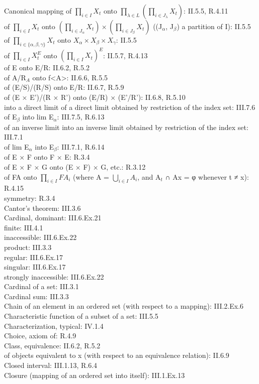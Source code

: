 Canonical mapping of \(\prod_{i\in I}X_t\) onto \(\prod_{\lambda \in L}\left(\prod_{i\in J_\lambda}X_t\right)\): II.5.5, R.4.11\\
of \(\prod_{i\in I}X_t\) onto \(\left(\prod_{i\in J_\alpha}X_t\right) \times \left(\prod_{i\in J_\beta}X_t\right)\) ((J\(_\alpha\), J\(_\beta\)) a partition of I): II.5.5\\
of \(\prod_{i\in \{\alpha,\beta,\gamma\}}X_t\) onto \(X_\alpha \times X_\beta \times X_\gamma\): II.5.5\\
of \(\prod_{i\in I}X_t^E\) onto \(\left(\prod_{i\in I}X_t\right)^E\): II.5.7, R.4.13\\
of E onto E/R: II.6.2, R.5.2\\
of A/R\(_A\) onto f\textless A\textgreater: II.6.6, R.5.5\\
of (E/S)/(R/S) onto E/R: II.6.7, R.5.9\\
of (E × E')/(R × R') onto (E/R) × (E'/R'): II.6.8, R.5.10\\
into a direct limit of a direct limit obtained by restriction of the index set: III.7.6\\
of E\(_\beta\) into lim E\(_\alpha\): III.7.5, R.6.13\\
of an inverse limit into an inverse limit obtained by restriction of the index set: III.7.1\\
of lim E\(_\alpha\) into E\(_\beta\): III.7.1, R.6.14\\
of E × F onto F × E: R.3.4\\
of E × F × G onto (E × F) × G, etc.: R.3.12\\
of FA onto \(\prod_{i\in I}FA_i\) (where A = \(\bigcup_{i\in I}A_i\), and A\(_t\) ∩ Ax = φ whenever t ≠ x): R.4.15\\
symmetry: R.3.4\\
Cantor's theorem: III.3.6\\
Cardinal, dominant: III.6.Ex.21\\
finite: III.4.1\\
inaccessible: III.6.Ex.22\\
product: III.3.3\\
regular: III.6.Ex.17\\
singular: III.6.Ex.17\\
strongly inaccessible: III.6.Ex.22\\
Cardinal of a set: III.3.1\\
Cardinal sum: III.3.3\\
Chain of an element in an ordered set (with respect to a mapping): III.2.Ex.6\\
Characteristic function of a subset of a set: III.5.5\\
Characterization, typical: IV.1.4\\
Choice, axiom of: R.4.9\\
Class, equivalence: II.6.2, R.5.2\\
of objects equivalent to x (with respect to an equivalence relation): II.6.9\\
Closed interval: III.1.13, R.6.4\\
Closure (mapping of an ordered set into itself): III.1.Ex.13

